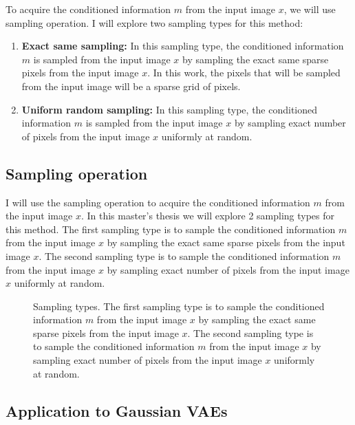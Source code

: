To acquire the conditioned information $m$ from the input image $x$, we will use sampling operation. I will explore two sampling types for this method:

\begin{enumerate}
    \item \textbf{Exact same sampling:} In this sampling type, the conditioned information $m$ is sampled from the input image $x$ by sampling the exact same sparse pixels from the input image $x$. In this work, the pixels that will be sampled from the input image will be a sparse grid of pixels.
    \item \textbf{Uniform random sampling:} In this sampling type, the conditioned information $m$ is sampled from the input image $x$ by sampling exact number of pixels from the input image $x$ uniformly at random.
\end{enumerate}



\subsection{Sampling operation}

I will use the sampling operation to acquire the conditioned information $m$ from the input image $x$. In this master's thesis we will explore 2 sampling types for this method. The first sampling type is to sample the conditioned information $m$ from the input image $x$ by sampling the exact same sparse pixels from the input image $x$. The second sampling type is to sample the conditioned information $m$ from the input image $x$ by sampling exact number of pixels from the input image $x$ uniformly at random. 

\begin{figure}[H]
    \centering 
    
    \caption[Sampling types.]%
    { 
        Sampling types. The first sampling type is to sample the conditioned information $m$ from the input image $x$ by sampling the exact same sparse pixels from the input image $x$. The second sampling type is to sample the conditioned information $m$ from the input image $x$ by sampling exact number of pixels from the input image $x$ uniformly at random. 
    }\label{SamplingFigure}
\end{figure}

\subsection{Application to Gaussian VAEs}

